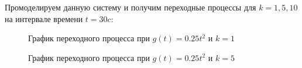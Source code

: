 \documentclass[a4paper, 11pt]{article}
\begin{document}
\par 
Промоделируем данную систему и получим переходные процессы для $k = 1, 5, 10$ на интервале времени $t = 30c$:

\newpage
\begin{figure}[h!]
\caption{График переходного процесса при $g(t)=0.25t^2$ и $k = 1$}
\label{ris:image}
\end{figure}

\begin{figure}[h!]
\caption{График переходного процесса при $g(t)=0.25t^2$ и $k = 5$}
\label{ris:image}
\end{figure}
\end{document}
